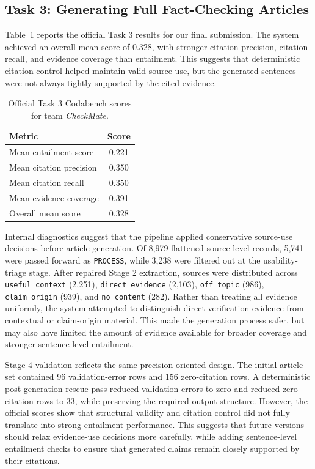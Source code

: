 \documentclass[
]{ceurart}
\begin{document}
\subsection{Task 3: Generating Full Fact-Checking Articles}

Table~\ref{tab:task3_codabench} reports the official Task 3 results for our final submission. The system achieved an overall mean score of 0.328, with stronger citation precision, citation recall, and evidence coverage than entailment. This suggests that deterministic citation control helped maintain valid source use, but the generated sentences were not always tightly supported by the cited evidence.

\begin{table}[h]
  \caption{Official Task 3 Codabench scores for team \textit{CheckMate}.}
  \label{tab:task3_codabench}
  \centering
  \begin{tabular}{lc}
    \toprule
    Metric & Score \\
    \midrule
    Mean entailment score & 0.221 \\
    Mean citation precision & 0.350 \\
    Mean citation recall & 0.350 \\
    Mean evidence coverage & 0.391 \\
    Overall mean score & 0.328 \\
    \bottomrule
  \end{tabular}
\end{table}

Internal diagnostics suggest that the pipeline applied conservative source-use decisions before article generation. Of 8,979 flattened source-level records, 5,741 were passed forward as \texttt{PROCESS}, while 3,238 were filtered out at the usability-triage stage. After repaired Stage 2 extraction, sources were distributed across \texttt{useful\_context} (2,251), \texttt{direct\_evidence} (2,103), \texttt{off\_topic} (986), \texttt{claim\_origin} (939), and \texttt{no\_content} (282). Rather than treating all evidence uniformly, the system attempted to distinguish direct verification evidence from contextual or claim-origin material. This made the generation process safer, but may also have limited the amount of evidence available for broader coverage and stronger sentence-level entailment.

Stage 4 validation reflects the same precision-oriented design. The initial article set contained 96 validation-error rows and 156 zero-citation rows. A deterministic post-generation rescue pass reduced validation errors to zero and reduced zero-citation rows to 33, while preserving the required output structure. However, the official scores show that structural validity and citation control did not fully translate into strong entailment performance. This suggests that future versions should relax evidence-use decisions more carefully, while adding sentence-level entailment checks to ensure that generated claims remain closely supported by their citations.
\end{document}
